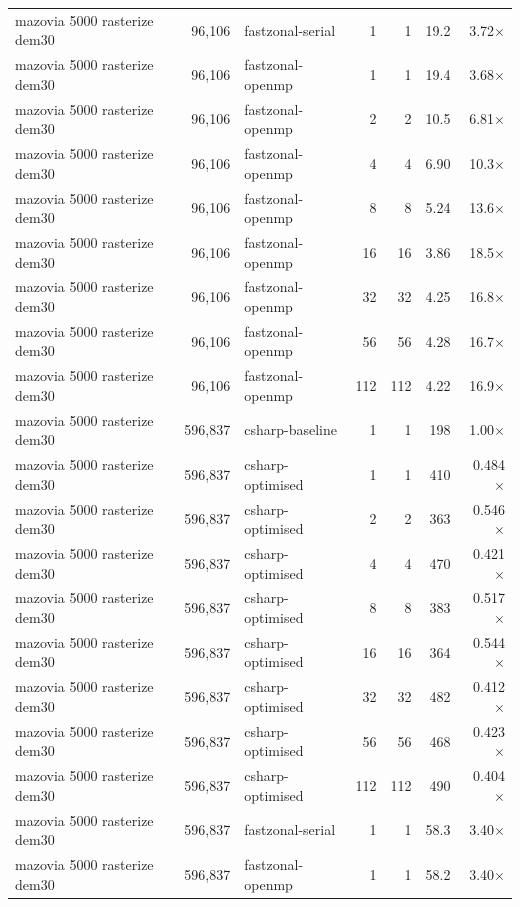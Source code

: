 \begin{tabular}{lrlrrrr}
mazovia 5000 rasterize dem30 & 96,106 & fastzonal-serial & 1 & 1 & 19.2 & 3.72$\times$ \\
mazovia 5000 rasterize dem30 & 96,106 & fastzonal-openmp & 1 & 1 & 19.4 & 3.68$\times$ \\
mazovia 5000 rasterize dem30 & 96,106 & fastzonal-openmp & 2 & 2 & 10.5 & 6.81$\times$ \\
mazovia 5000 rasterize dem30 & 96,106 & fastzonal-openmp & 4 & 4 & 6.90 & 10.3$\times$ \\
mazovia 5000 rasterize dem30 & 96,106 & fastzonal-openmp & 8 & 8 & 5.24 & 13.6$\times$ \\
mazovia 5000 rasterize dem30 & 96,106 & fastzonal-openmp & 16 & 16 & 3.86 & 18.5$\times$ \\
mazovia 5000 rasterize dem30 & 96,106 & fastzonal-openmp & 32 & 32 & 4.25 & 16.8$\times$ \\
mazovia 5000 rasterize dem30 & 96,106 & fastzonal-openmp & 56 & 56 & 4.28 & 16.7$\times$ \\
mazovia 5000 rasterize dem30 & 96,106 & fastzonal-openmp & 112 & 112 & 4.22 & 16.9$\times$ \\
mazovia 5000 rasterize dem30 & 596,837 & csharp-baseline & 1 & 1 & 198 & 1.00$\times$ \\
mazovia 5000 rasterize dem30 & 596,837 & csharp-optimised & 1 & 1 & 410 & 0.484$\times$ \\
mazovia 5000 rasterize dem30 & 596,837 & csharp-optimised & 2 & 2 & 363 & 0.546$\times$ \\
mazovia 5000 rasterize dem30 & 596,837 & csharp-optimised & 4 & 4 & 470 & 0.421$\times$ \\
mazovia 5000 rasterize dem30 & 596,837 & csharp-optimised & 8 & 8 & 383 & 0.517$\times$ \\
mazovia 5000 rasterize dem30 & 596,837 & csharp-optimised & 16 & 16 & 364 & 0.544$\times$ \\
mazovia 5000 rasterize dem30 & 596,837 & csharp-optimised & 32 & 32 & 482 & 0.412$\times$ \\
mazovia 5000 rasterize dem30 & 596,837 & csharp-optimised & 56 & 56 & 468 & 0.423$\times$ \\
mazovia 5000 rasterize dem30 & 596,837 & csharp-optimised & 112 & 112 & 490 & 0.404$\times$ \\
mazovia 5000 rasterize dem30 & 596,837 & fastzonal-serial & 1 & 1 & 58.3 & 3.40$\times$ \\
mazovia 5000 rasterize dem30 & 596,837 & fastzonal-openmp & 1 & 1 & 58.2 & 3.40$\times$ \\

\end{tabular}
